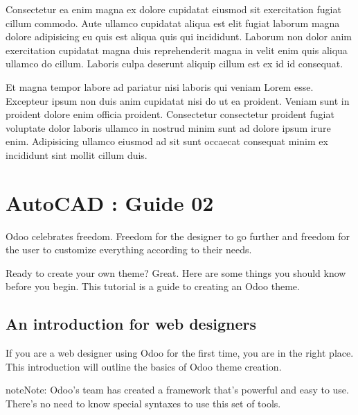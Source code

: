 \documentclass[a4paper,10pt,french]{sphinxmanual}
\begin{document}
Consectetur ea enim magna ex dolore cupidatat eiusmod sit exercitation fugiat cillum commodo. Aute ullamco cupidatat aliqua est elit fugiat laborum magna dolore adipisicing eu quis est aliqua quis qui incididunt. Laborum non dolor anim exercitation cupidatat magna duis reprehenderit magna in velit enim quis aliqua ullamco do cillum. Laboris culpa deserunt aliquip cillum est ex id id consequat.

Et magna tempor labore ad pariatur nisi laboris qui veniam Lorem esse. Excepteur ipsum non duis anim cupidatat nisi do ut ea proident. Veniam sunt in proident dolore enim officia proident. Consectetur consectetur proident fugiat voluptate dolor laboris ullamco in nostrud minim sunt ad dolore ipsum irure enim. Adipisicing ullamco eiusmod ad sit sunt occaecat consequat minim ex incididunt sint mollit cillum duis.


\chapter{AutoCAD : Guide 02}
\label{\detokenize{docs/guides/autocad-guide02::doc}}\label{\detokenize{docs/guides/autocad-guide02:autodesk}}\label{\detokenize{docs/guides/autocad-guide02:autocad-guide02}}\label{\detokenize{docs/guides/autocad-guide02:autocad-guide-02}}
Odoo celebrates freedom. Freedom for the designer to go further and
freedom for the user to customize everything according to their needs.

Ready to create your own theme? Great. Here are some things you should know before you begin. This tutorial is a guide to creating an Odoo theme.

\noindent{}


\section{An introduction for web designers}
\label{\detokenize{docs/guides/autocad-guide02:an-introduction-for-web-designers}}
If you are a web designer using Odoo for the first time, you are in the right place.
This introduction will outline the basics of Odoo theme creation.

\begin{sphinxadmonition}{note}{Note:}
Odoo’s team has created a framework that’s powerful and easy to use. There’s no need to know special syntaxes to use this set of tools.
\end{sphinxadmonition}
\end{document}
